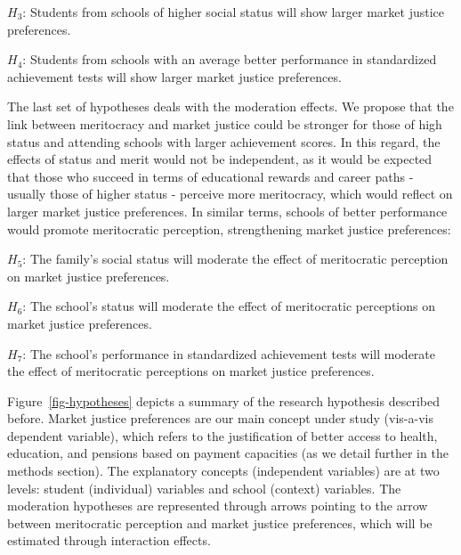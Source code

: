 \documentclass[
    behavsci,
    article,
    submit,
moreauthors
]{mdpi}
\begin{document}
\(H_3\): Students from schools of higher social status will show larger
market justice preferences.

\(H_4\): Students from schools with an average better performance in
standardized achievement tests will show larger market justice
preferences.

The last set of hypotheses deals with the moderation effects. We propose
that the link between meritocracy and market justice could be stronger
for those of high status and attending schools with larger achievement
scores. In this regard, the effects of status and merit would not be
independent, as it would be expected that those who succeed in terms of
educational rewards and career paths - usually those of higher status -
perceive more meritocracy, which would reflect on larger market justice
preferences. In similar terms, schools of better performance would
promote meritocratic perception, strengthening market justice
preferences:

\(H_5\): The family's social status will moderate the effect of
meritocratic perception on market justice preferences.

\(H_6\): The school's status will moderate the effect of meritocratic
perceptions on market justice preferences.

\(H_7\): The school's performance in standardized achievement tests will
moderate the effect of meritocratic perceptions on market justice
preferences.

Figure~\ref{fig-hypotheses} depicts a summary of the research hypothesis
described before. Market justice preferences are our main concept under
study (vis-a-vis dependent variable), which refers to the justification
of better access to health, education, and pensions based on payment
capacities (as we detail further in the methods section). The
explanatory concepts (independent variables) are at two levels: student
(individual) variables and school (context) variables. The moderation
hypotheses are represented through arrows pointing to the arrow between
meritocratic perception and market justice preferences, which will be
estimated through interaction effects.
\end{document}
